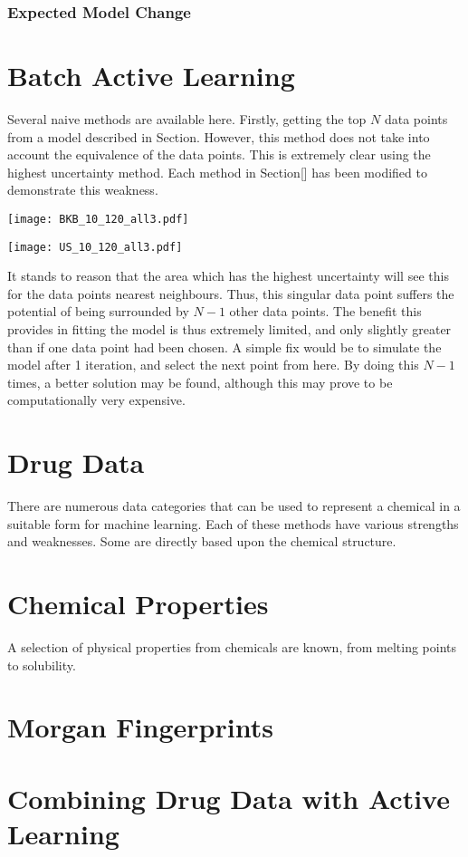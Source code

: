 \subsubsection{Expected Model Change}

\section{Batch Active Learning}
Several naive methods are available here. Firstly, getting the top $N$ data points from a model described in Section. However, this method does not take into account the equivalence of the data points. This is extremely clear using the highest uncertainty method. Each method in Section[] has been modified to demonstrate this weakness.

\begin{center}
  \texttt{[image: BKB\_10\_120\_all3.pdf]}
\end{center}
\begin{center}
  \texttt{[image: US\_10\_120\_all3.pdf]}
\end{center}

It stands to reason that the area which has the highest uncertainty will see this for the data points nearest neighbours. Thus, this singular data point suffers the potential of being surrounded by $N-1$ other data points. The benefit this provides in fitting the model is thus extremely limited, and only slightly greater than if one data point had been chosen. A simple fix would be to simulate the model after 1 iteration, and select the next point from here. By doing this $N-1$ times, a better solution may be found, although this may prove to be computationally very expensive.

\section{Drug Data}
There are numerous data categories that can be used to represent a chemical in a suitable form for machine learning. Each of these methods have various strengths and weaknesses. Some are directly based upon the chemical structure.
\section{Chemical Properties}
A selection of physical properties from chemicals are known, from melting points to solubility.
\blindtext[1]
\section{Morgan Fingerprints}
\blindtext[1]
\section{Combining Drug Data with Active Learning}
\blindtext[1]